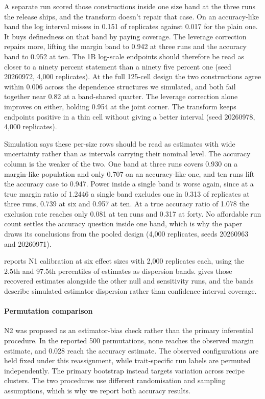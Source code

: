 A separate run scored those constructions inside one size band at the three runs the release ships, and the transform doesn't repair that case. On an accuracy-like band the log interval misses in 0.151 of replicates against 0.017 for the plain one. It buys definedness on that band by paying coverage. The leverage correction repairs more, lifting the margin band to 0.942 at three runs and the accuracy band to 0.952 at ten. The 1B log-scale endpoints should therefore be read as closer to a ninety percent statement than a ninety five percent one (seed 20260972, 4,000 replicates). At the full 125-cell design the two constructions agree within 0.006 across the dependence structures we simulated, and both fail together near 0.82 at a band-shared quarter. The leverage correction alone improves on either, holding 0.954 at the joint corner. The transform keeps endpoints positive in a thin cell without giving a better interval (seed 20260978, 4,000 replicates).

Simulation says these per-size rows should be read as estimates with wide uncertainty rather than as intervals carrying their nominal level. The accuracy column is the weaker of the two. One band at three runs covers 0.930 on a margin-like population and only 0.707 on an accuracy-like one, and ten runs lift the accuracy case to 0.947. Power inside a single band is worse again, since at a true margin ratio of 1.2446 a single band excludes one in 0.313 of replicates at three runs, 0.739 at six and 0.957 at ten. At a true accuracy ratio of 1.078 the exclusion rate reaches only 0.081 at ten runs and 0.317 at forty. No affordable run count settles the accuracy question inside one band, which is why the paper draws its conclusions from the pooled design (4,000 replicates, seeds 20260963 and 20260971).

 reports N1 calibration at six effect sizes with 2,000 replicates each, using the 2.5th and 97.5th percentiles of estimates as dispersion bands.  gives those recovered estimates alongside the other null and sensitivity runs, and the bands describe simulated estimator dispersion rather than confidence-interval coverage.

\paragraph{Permutation comparison}
N2 was proposed as an estimator-bias check rather than the primary inferential procedure. In the reported 500 permutations, none reaches the observed margin estimate, and 0.028 reach the accuracy estimate. The observed configurations are held fixed under this reassignment, while trait-specific run labels are permuted independently. The primary bootstrap instead targets variation across recipe clusters. The two procedures use different randomisation and sampling assumptions, which is why we report both accuracy results.


